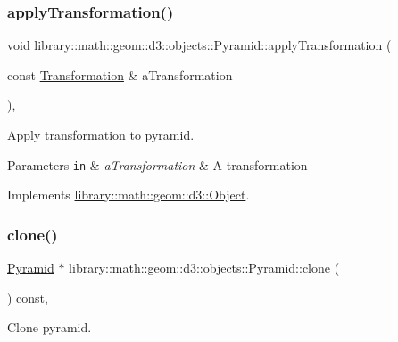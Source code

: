 \subsubsection{\texorpdfstring{apply\+Transformation()}{applyTransformation()}}
{\footnotesize\ttfamily void library\+::math\+::geom\+::d3\+::objects\+::\+Pyramid\+::apply\+Transformation (\begin{DoxyParamCaption}\item[{const \hyperlink{classlibrary_1_1math_1_1geom_1_1d3_1_1_transformation}{Transformation} \&}]{a\+Transformation }\end{DoxyParamCaption})\hspace{0.3cm}{\ttfamily [override]}, {\ttfamily [virtual]}}



Apply transformation to pyramid. 


\begin{DoxyParams}[1]{Parameters}
\mbox{\tt in}  & {\em a\+Transformation} & A transformation \\
\hline
\end{DoxyParams}


Implements \hyperlink{classlibrary_1_1math_1_1geom_1_1d3_1_1_object_a5fc47b1ee5d9a28efc6010d3d1512470}{library\+::math\+::geom\+::d3\+::\+Object}.

\mbox{\label{classlibrary_1_1math_1_1geom_1_1d3_1_1objects_1_1_pyramid_a734bc02bbfec62647743649bf5d2b706}} 
\subsubsection{\texorpdfstring{clone()}{clone()}}
{\footnotesize\ttfamily \hyperlink{classlibrary_1_1math_1_1geom_1_1d3_1_1objects_1_1_pyramid}{Pyramid} $\ast$ library\+::math\+::geom\+::d3\+::objects\+::\+Pyramid\+::clone (\begin{DoxyParamCaption}{ }\end{DoxyParamCaption}) const\hspace{0.3cm}{\ttfamily [override]}, {\ttfamily [virtual]}}



Clone pyramid. 

